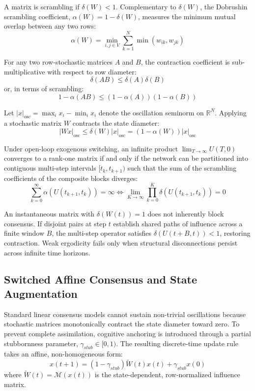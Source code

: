 A matrix is scrambling if $\delta(W) < 1$\cite{degroot1974reaching}. Complementary to $\delta(W)$, the Dobrushin scrambling coefficient, $\alpha(W) = 1 - \delta(W)$, measures the minimum mutual overlap between any two rows\cite{acemoglu2013opinion,hajnal1958weak}: $$\alpha(W) = \min_{i, j \in V} \sum_{k=1}^N \min(w_{ik}, w_{jk})$$

For any two row-stochastic matrices $A$ and $B$, the contraction coefficient is sub-multiplicative with respect to row diameter\cite{acemoglu2013opinion}: $$\delta(AB) \le \delta(A) \delta(B)$$ or, in terms of scrambling\cite{acemoglu2013opinion}: $$1 - \alpha(AB) \le (1 - \alpha(A))(1 - \alpha(B))$$

Let $|x|_{\text{osc}} = \max_i x_i - \min_i x_i$ denote the oscillation seminorm on $\mathbb{R}^N$. Applying a stochastic matrix $W$ contracts the state diameter\cite{hajnal1958weak}: $$|Wx|_{\text{osc}} \le \delta(W) |x|_{\text{osc}} = (1 - \alpha(W)) |x|_{\text{osc}}$$

Under open-loop exogenous switching, an infinite product $\lim_{T \to \infty} U(T, 0)$ converges to a rank-one matrix if and only if the network can be partitioned into contiguous multi-step intervals $[t_k, t_{k+1})$ such that the sum of the scrambling coefficients of the composite blocks diverges\cite{acemoglu2013opinion,hajnal1958weak}: $$\sum_{k=0}^\infty \alpha(U(t_{k+1}, t_k)) = \infty \iff \lim_{K \to \infty} \prod_{k=0}^K \delta(U(t_{k+1}, t_k)) = 0$$

An instantaneous matrix with $\delta(W(t)) = 1$ does not inherently block consensus\cite{acemoglu2013opinion,hajnal1958weak}. If disjoint pairs at step $t$ establish shared paths of influence across a finite window $B$, the multi-step operator satisfies $\delta(U(t+B, t)) < 1$, restoring contraction\cite{acemoglu2013opinion,hajnal1958weak}. Weak ergodicity fails only when structural disconnections persist across infinite time horizons\cite{degroot1974reaching,hajnal1958weak}.

\subsection{Switched Affine Consensus and State Augmentation}
Standard linear consensus models cannot sustain non-trivial oscillations because stochastic matrices monotonically contract the state diameter toward zero\cite{hajnal1958weak}. To prevent complete assimilation, cognitive anchoring is introduced through a partial stubbornness parameter, $\gamma_{stub} \in [0, 1)$\cite{degroot1974reaching}. The resulting discrete-time update rule takes an affine, non-homogeneous form\cite{degroot1974reaching,acemoglu2013opinion}: $$x(t+1) = (1 - \gamma_{stub}) \tilde{W}(t) x(t) + \gamma_{stub} x(0)$$ where $\tilde{W}(t) = \mathcal{M}(x(t))$ is the state-dependent, row-normalized influence matrix\cite{degroot1974reaching,hajnal1958weak}.

